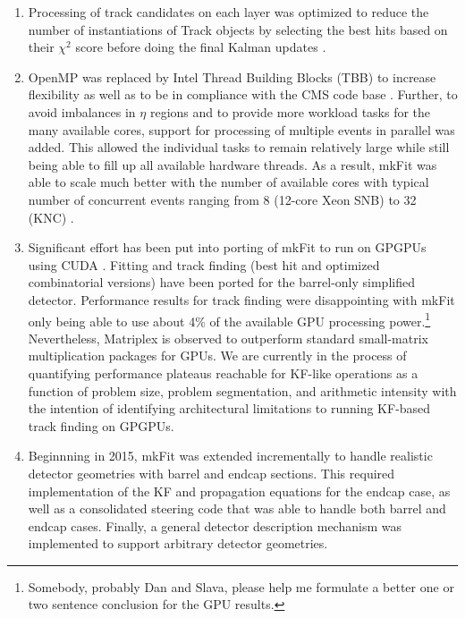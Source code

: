 \documentclass{webofc}
\def\mkfit{mkFit\xspace}
\begin{document}
\begin{enumerate}\topsep-2pt\itemsep-2pt

\item Processing of track candidates on each layer was optimized to
  reduce the number of instantiations of Track objects by selecting the best
  hits based on their $\chi^2$ score before doing the final Kalman updates
  \cite{pkf-clone-engine}.

\item OpenMP was replaced by Intel Thread Building Blocks (TBB) to increase
  flexibility as well as to be in compliance with the CMS code base
  \cite{pkf-tbb}. Further, to avoid imbalances in $\eta$ regions and to provide
  more workload tasks for the many available cores, support for processing of
  multiple events in parallel was added. This allowed the individual tasks
  to remain relatively large while still being able to fill up all available
  hardware threads. As a result, \mkfit was able to scale much better with
  the number of available cores with typical number of concurrent events ranging
  from 8 (12-core Xeon SNB) to 32 (KNC) \cite{pkf-acat-17}.

\item Significant effort has been put into porting of \mkfit to run on GPGPUs
  using CUDA \cite{pkf-gpu}. Fitting and track finding (best hit and optimized
  combinatorial versions) have been ported for the barrel-only simplified
  detector. Performance results for track finding were disappointing with \mkfit
  only being able to use about 4\% of the available GPU processing
  power.\footnote{Somebody, probably Dan and Slava, please help me formulate a
    better one or two sentence conclusion for the GPU results.} Nevertheless,
  Matriplex is observed to outperform standard small-matrix multiplication
  packages for GPUs. We are currently in the process of quantifying performance
  plateaus reachable for KF-like operations as a function of problem size,
  problem segmentation, and arithmetic intensity with the intention of
  identifying architectural limitations to running KF-based track finding on
  GPGPUs.

\item Beginnning in 2015, \mkfit was extended incrementally to handle realistic
  detector geometries with barrel and endcap sections. This required
  implementation of the KF and propagation equations for the endcap case, as
  well as a consolidated steering code that was able to handle both barrel and
  endcap cases. Finally, a general detector description mechanism was
  implemented to support arbitrary detector geometries.


\end{enumerate}
\end{document}
